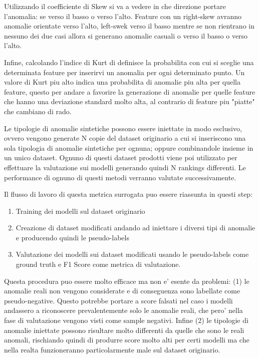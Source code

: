 Utilizzando il coefficiente di Skew si va a vedere in che direzione portare l'anomalia: se verso il basso o verso l'alto. Feature con un right-skew avranno anomalie orientate verso l'alto, left-swek verso il basso mentre se non rientrano in nessuno dei due casi allora si generano anomalie casuali o verso il basso o verso l'alto.

Infine, calcolando l'indice di Kurt di definisce la probabilita con cui si sceglie una determinata feature per inserirvi un anomalia per ogni determinato punto. Un valore di Kurt piu alto indica una probabilita di anomalie piu alta per quella feature, questo per andare a favorire la generazione di anomalie per quelle feature che hanno una deviazione standard molto alta, al contrario di feature piu "piatte" che cambiano di rado.


Le tipologie di anomalie sintetiche possono essere iniettate in modo esclusivo, ovvero vengono generate N copie del dataset originario a cui si inseriscono una sola tipologia di anomalie sintetiche per ognuna; oppure combinandole insieme in un unico dataset. 
Ognuno di questi dataset prodotti viene poi utilizzato per effettuare la valutazione sui modelli generando quindi N rankings differenti. Le performance di ognuno di questi metodi verranno valutate successivamente.

Il flusso di lavoro di questa metrica surrogata puo essere riassunta in questi step:
\begin{enumerate}
	\item Training dei modelli sul dataset originario
	\item Creazione di dataset modificati andando ad iniettare i diversi tipi di anomalie e producendo quindi le pseudo-labels
	\item Valutazione dei modelli sui dataset modificati usando le pseudo-labels come ground truth e F1 Score come metrica di valutazione.
\end{enumerate}


Questa procedura puo essere molto efficace ma non e' esente da problemi: (1) le anomalie reali non vengono considerate e di conseguenza sono labellate come pseudo-negative. Questo potrebbe portare a score falsati nel caso i modelli andassero a riconoscere prevalentemente solo le anomalie reali, che pero' nella fase di valutazione vengono visti come sample negativi. Infine (2) le tipologie di anomalie iniettate possono risultare molto differenti da quelle che sono le reali anomali, rischiando quindi di produrre score molto alti per certi modelli ma che nella realta funzioneranno particolarmente male sul dataset originario.

